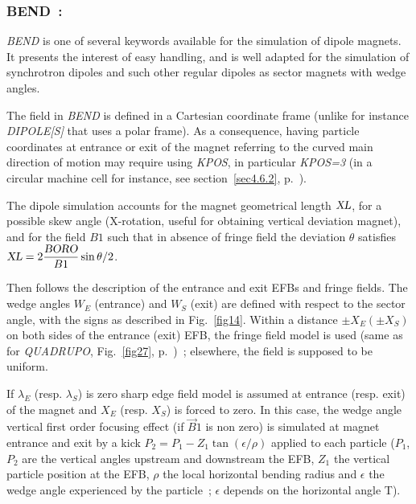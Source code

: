 \newpage


\subsubsection*{BEND~: \BENDTitl}\label{BEND}  
\medskip

\textsl{BEND}  is one of  several keywords available for the
simulation of dipole magnets. It presents the interest of easy handling, and is well adapted for 
the simulation of synchrotron dipoles and such other regular dipoles as sector magnets with wedge 
angles. 

\bigskip

\noindent The field in \textsl{BEND}  is defined in a Cartesian coordinate frame (unlike for instance \textsl{DIPOLE[S]} 
that uses a polar frame).  As a consequence, having particle coordinates at entrance  or exit of the magnet 
referring to the  curved  main direction of motion may 
require using \textsl{KPOS}, in particular \textsl{KPOS=3}  (in a circular machine cell for instance, 
see section~\ref{sec4.6.2}, p.~\pageref{sec4.6.2}). 

\bigskip

\noindent The dipole simulation accounts for the magnet geometrical length $ \textsl{XL} $, for a possible 
 skew angle (X-rotation, useful for obtaining vertical deviation magnet), and for the 
field $ B1 $  such that   in absence of fringe field the deviation $\theta$ satisfies 
$ \textsl{XL} = 2 \dfrac{\textsl{BORO}}{B1} \sin \theta/2$. 

\bigskip

\noindent Then follows the description of the entrance and exit EFBs and
fringe fields.       The wedge angles $W_E $ 
(entrance) and $W_S $ (exit) are defined with respect to the sector angle, 
with the signs as described in Fig.~\ref{fig14}.  
Within a distance $ \pm X_E(\pm X_S) $ on both sides of the entrance (exit) EFB, 
the fringe field model is used (same as for \textsl{QUADRUPO}, 
Fig.~\ref{fig27}, p.~\pageref{fig27})~; elsewhere, the field is supposed to be uniform. 

\bigskip

\noindent If $\lambda_{E} $ (resp. $\lambda_{S} $) is zero sharp edge field model is assumed at entrance 
(resp. exit) of the magnet and $X_E$ (resp. $X_S$) is forced to zero.  In this case, the wedge angle vertical first order 
focusing effect (if $\vec  B1$ is non zero) is simulated at magnet entrance and exit by a kick 
$P_2 = P_1 - Z_1 \tan (\epsilon / \rho)$ applied to each particle ($P_1$, $P_2$ are the vertical angles 
upstream and downstream the EFB, $Z_1$ the vertical particle position at the EFB, $\rho$ the local horizontal 
bending radius and $\epsilon$ the wedge angle experienced by the particle~; $\epsilon$ depends on the horizontal angle T).


